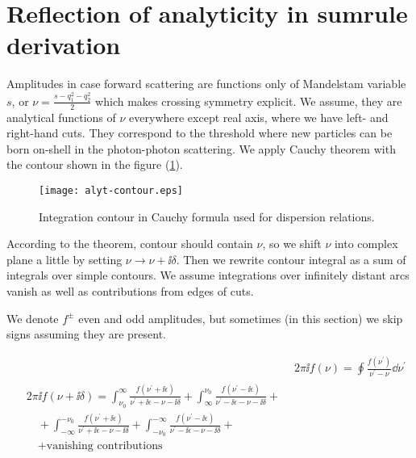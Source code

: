 \section{Reflection of analyticity in sumrule derivation} \label{sec:app:alyt-sr}

Amplitudes in case forward scattering are functions only of Mandelstam variable $s$, or $\nu = \frac{s - q_1^2 - q_2^2}{2}$ which makes crossing symmetry explicit. We assume, they are analytical functions of $\nu$ everywhere except real axis, where we have left- and right-hand cuts. They correspond to the threshold where new particles can be born on-shell in the photon-photon scattering. We apply Cauchy theorem with the contour shown in the figure (\cref{fig:app:sr-contour}).

\begin{figure}[H]
    \centering
    \texttt{[image: alyt-contour.eps]}
    \caption{Integration contour in Cauchy formula used for dispersion relations. \label{fig:app:sr-contour}}
\end{figure}

According to the theorem, contour should contain $\nu$, so we shift $\nu$ into complex plane a little by setting $\nu \rightarrow \nu+\ii \delta$. Then we rewrite contour integral as a sum of integrals over simple contours. We assume integrations over infinitely distant arcs vanish as well as contributions from edges of cuts.

We denote $f^{\pm}$ even and odd amplitudes, but sometimes (in this section) we skip signs assuming they are present.

\begin{align}
    &2 \pi \ii f(\nu) = \oint \frac{f(\nu^\prime)}{\nu^\prime - \nu} \dd{\nu^\prime} \\
    \begin{split}
        &2\pi \ii f(\nu+\ii\delta) = \int_{\nu_0}^{\infty} \frac{f(\nu^\prime + \ii \epsilon)}{\nu^\prime + \ii \epsilon - \nu - \ii \delta} + \int_{\infty}^{\nu_0} \frac{f(\nu^\prime-\ii \epsilon)}{\nu^\prime - \ii \epsilon - \nu - \ii \delta} + \\
        &\quad + \int_{-\infty}^{-\nu_0} \frac{f(\nu^\prime+\ii \epsilon)}{\nu^\prime + \ii \epsilon - \nu - \ii \delta}+ \int_{-\nu_0}^{-\infty} \frac{f(\nu^\prime-\ii \epsilon)}{\nu^\prime - \ii \epsilon - \nu - \ii \delta} + \\
        &\quad + \text{vanishing contributions}
    \end{split} \label{eq:app:alyt-ampl-init}
\end{align}

